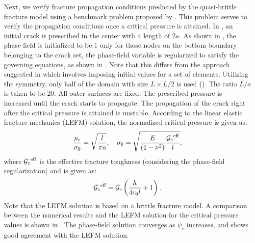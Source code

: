 Next, we verify fracture propagation conditions predicted by the quasi-brittle fracture model using a benchmark problem proposed by \citet{WILSON2016264}. This problem serves to verify the propagation conditions once a critical pressure is attained. In , an initial crack is prescribed in the center with a length of $2a$. As shown in , the phase-field is initialized to be 1 only for those nodes on the bottom boundary belonging to the crack set, the phase-field variable is regularized to satisfy the governing equations, as shown in . Note that this differs from the approach suggested in \cite{WILSON2016264,YOSHIOKA2020113210} which involves imposing initial values for a set of elements.
Utilizing the symmetry, only half of the domain with size $L \times L/2$ is used (). The ratio $L/a$ is taken to be 20. All outer surfaces are fixed. The prescribed pressure is increased until the crack starts to propagate. The propagation of the crack right after the critical pressure is attained is unstable. According to the linear elastic fracture mechanics (LEFM) solution, the normalized critical pressure is given as:
\begin{equation}
  \dfrac{p_c}{\sigma_0} = \sqrt{\dfrac{l}{\pi a}}, \quad \sigma_0=\sqrt{\dfrac{E}{(1-\nu^2)} \dfrac{{\mathcal{G}_c}^\text{eff}}{l}},
\end{equation}
where ${\mathcal{G}_c}^\text{eff}$ is the effective fracture toughness (considering the phase-field regularization) \cite{Bourding2008,YOSHIOKA2020113210} and is given as:
\begin{equation}
  {\mathcal{G}_c}^\text{eff} = {\mathcal{G}_c}\left(\dfrac{h}{4c_0l}+1\right).
\end{equation}
Note that the LEFM solution is based on a brittle fracture model. A comparison between the numerical results and the LEFM solution for the critical pressure values is shown in . The phase-field solution converges as $\psi_c$ increases, and shows good agreement with the LEFM solution.


